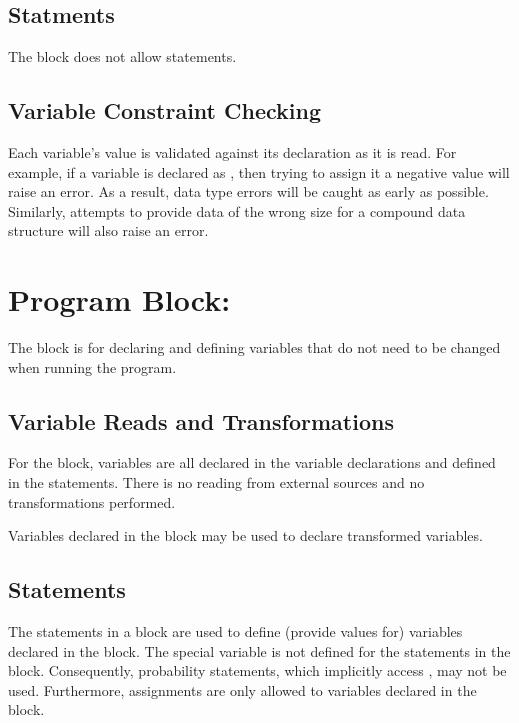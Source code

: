 \subsection{Statments}

The  block does not allow statements.

\subsection{Variable Constraint Checking}

Each variable's value is validated against its declaration as it is
read.  For example, if a variable  is declared as
, then trying to assign it a negative value will raise
an error.  As a result, data type errors will be caught as early as
possible.  Similarly, attempts to provide data of the wrong size for a
compound data structure will also raise an error.


\section{Program Block: }

The  block is for declaring and defining
variables that do not need to be changed when running the program.  

\subsection{Variable Reads and Transformations}

For the  block, variables are all declared in
the variable declarations and defined in the statements.  There is no
reading from external sources and no transformations performed.

Variables declared in the  block may be used to declare
transformed variables.

\subsection{Statements}

The statements in a  block are used to define
(provide values for) variables declared in the 
block.  The special variable  is not defined for the
statements in the  block.  Consequently,
probability statements, which implicitly access , may not
be used.  Furthermore, assignments are only allowed to variables
declared in the  block.

